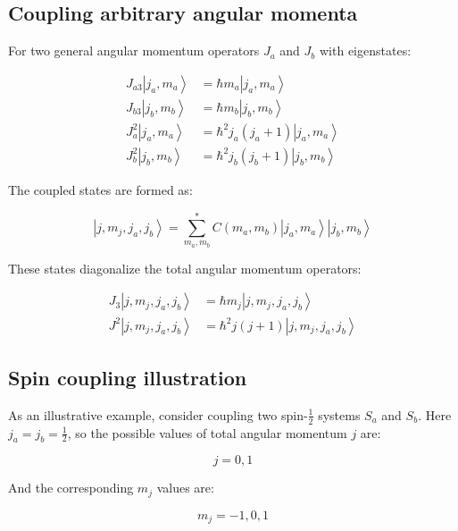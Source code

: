 \documentclass[italian]{HKNdocument}
\begin{document}
\subsection{Coupling arbitrary angular momenta}
For two general angular momentum operators $J_{a}$ and $J_{b}$ with eigenstates:

\begin{align}
J_{a3}\left|j_{a}, m_{a}\right\rangle &= \hbar m_{a}\left|j_{a}, m_{a}\right\rangle \\
J_{b3}\left|j_{b}, m_{b}\right\rangle &= \hbar m_{b}\left|j_{b}, m_{b}\right\rangle \\
J_{a}^{2}\left|j_{a}, m_{a}\right\rangle &= \hbar^2 j_{a}\left(j_{a}+1\right)\left|j_{a}, m_{a}\right\rangle  \\
J_{b}^{2}\left|j_{b}, m_{b}\right\rangle &= \hbar^{2} j_{b}\left(j_{b}+1\right)\left|j_{b}, m_{b}\right\rangle
\end{align}

The coupled states are formed as:

\begin{equation}
\left|j, m_{j}, j_{a}, j_{b}\right\rangle=\sum_{m_{a}, m_{b}}^{*} C\left(m_{a}, m_{b}\right)\left|j_{a}, m_{a}\right\rangle\left|j_{b}, m_{b}\right\rangle
\end{equation}

These states diagonalize the total angular momentum operators:

\begin{align}
J_{3}\left|j, m_{j}, j_{a}, j_{b}\right\rangle &= \hbar m_{j}\left|j, m_{j}, j_{a}, j_{b}\right\rangle \\
J^{2}\left|j, m_{j}, j_{a}, j_{b}\right\rangle &= \hbar^2 j(j+1)\left|j, m_{j}, j_{a}, j_{b}\right\rangle
\end{align}

\subsection{Spin coupling illustration}
As an illustrative example, consider coupling two spin-$\frac{1}{2}$ systems $S_{a}$ and $S_{b}$. Here $j_{a}=j_{b}=\frac{1}{2}$, so the possible values of total angular momentum $j$ are:

\begin{equation}
j=0,1
\end{equation}

And the corresponding $m_j$ values are:

\begin{equation}
m_{j}=-1,0,1
\end{equation}
\end{document}
